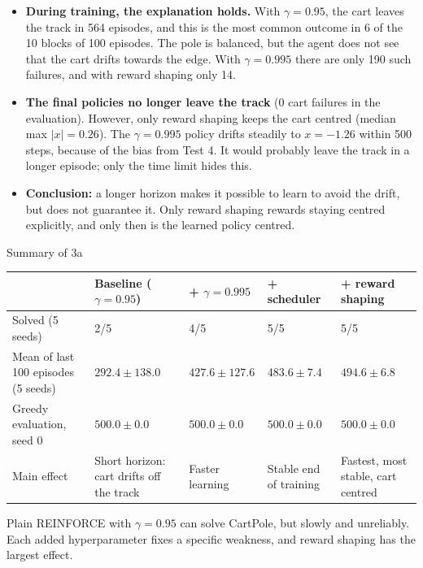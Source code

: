

\begin{itemize}
  \item \textbf{During training, the explanation holds.} With $\gamma = 0.95$, the cart leaves the track in 564 episodes, and this is the most common outcome in 6 of the 10 blocks of 100 episodes. The pole is balanced, but the agent does not see that the cart drifts towards the edge. With $\gamma = 0.995$ there are only 190 such failures, and with reward shaping only 14.
  \item \textbf{The final policies no longer leave the track} (0 cart failures in the evaluation). However, only reward shaping keeps the cart centred (median max $|x| = 0.26$). The $\gamma = 0.995$ policy drifts steadily to $x = -1.26$ within 500 steps, because of the bias from Test 4. It would probably leave the track in a longer episode; only the time limit hides this.
  \item \textbf{Conclusion:} a longer horizon makes it possible to learn to avoid the drift, but does not guarantee it. Only reward shaping rewards staying centred explicitly, and only then is the learned policy centred.
\end{itemize}

\FloatBarrier
\begin{summarybox}{Summary of 3a}
\small
\begin{tabularx}{\linewidth}{@{}lLLLL@{}}
  \toprule
  & \textbf{Baseline ($\gamma = 0.95$)} & \textbf{+ $\gamma = 0.995$} & \textbf{+ scheduler} & \textbf{+ reward shaping} \\
  \midrule
  Solved (5 seeds) & 2/5 & 4/5 & 5/5 & 5/5 \\
  Mean of last 100 episodes (5 seeds) & $292.4 \pm 138.0$ & $427.6 \pm 127.6$ & $483.6 \pm 7.4$ & $494.6 \pm 6.8$ \\
  Greedy evaluation, seed 0 & $500.0 \pm 0.0$ & $500.0 \pm 0.0$ & $500.0 \pm 0.0$ & $500.0 \pm 0.0$ \\
  Main effect & Short horizon: cart drifts off the track & Faster learning & Stable end of training & Fastest, most stable, cart centred \\
  \bottomrule
\end{tabularx}

\medskip
\normalsize
Plain REINFORCE with $\gamma = 0.95$ can solve CartPole, but slowly and unreliably. Each added hyperparameter fixes a specific weakness, and reward shaping has the largest effect.
\end{summarybox}
